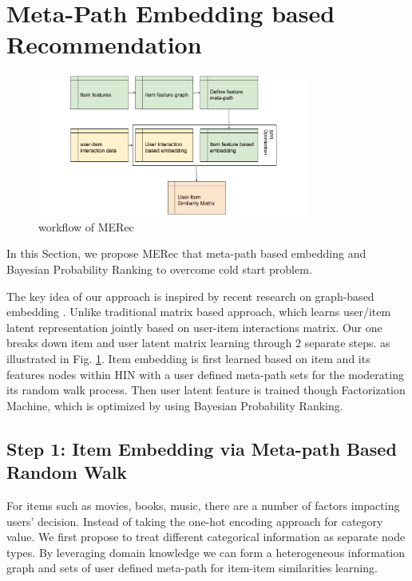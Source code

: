 \section{Meta-Path Embedding based Recommendation}

\begin{figure}[!t]
    \centering
    \includegraphics[width=0.8\textwidth]{figs/fig0.png}
    \caption{workflow of MERec}\label{fig:fe-overview}
\end{figure}

In this Section, we propose MERec that meta-path based embedding and Bayesian Probability Ranking to overcome cold start problem. 

The key idea of our approach is inspired by recent research on graph-based embedding \cite{dong2017metapath2vec}. Unlike traditional matrix based approach, which learns user/item latent representation jointly based on user-item interactions matrix. Our one breaks down item and user latent matrix learning through 2 separate steps. as illustrated in Fig. \ref{fig:fe-overview}. Item embedding is first learned based on item and its features nodes within HIN with a user defined meta-path sets for the moderating its random walk process. Then user latent feature is trained though Factorization Machine, which is optimized by using Bayesian Probability Ranking.

\subsection{Step 1: Item Embedding via Meta-path Based Random Walk}\label{3MF}

For items such as movies, books, music, there are a number of factors impacting users' decision. Instead of taking the one-hot encoding approach for category value. We first propose to treat different categorical information as separate node types. 
By leveraging domain knowledge we can form a heterogeneous information graph and sets of user defined meta-path for item-item similarities learning. 

